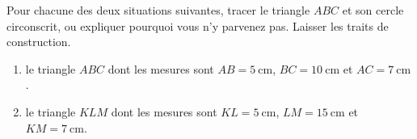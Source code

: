 
\begin{exercice}\label{exosmath-0977}

    Pour chacune des deux situations suivantes, tracer le triangle \( ABC\) et son cercle circonscrit, ou expliquer pourquoi vous n'y parvenez pas. Laisser les traits de construction.
    \begin{enumerate}
        \item
            le triangle \( ABC\) dont les mesures sont \( AB=\SI{5}{\centi\meter}\), \( BC=\SI{10}{\centi\meter}\) et \( AC=\SI{7}{\centi\meter}\).
        \item
            le triangle \( KLM\) dont les mesures sont \( KL=\SI{5}{\centi\meter}\), \( LM=\SI{15}{\centi\meter}\) et \( KM=\SI{7}{\centi\meter}\).
    \end{enumerate}

\end{exercice}
